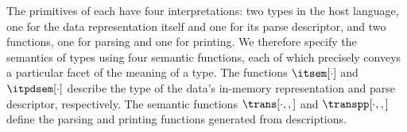 The primitives of \ddc{} each have four interpretations: two
types in the host language, one for the data representation
itself and one for its parse descriptor, and two functions,
one for parsing and one for printing.
We therefore specify the semantics of \ddc{} types using four semantic
functions, each of which precisely conveys a particular facet of the
meaning of a type.  The functions $\itsem[\cdot]$ and $\itpdsem[\cdot]$
describe the type of the data's in-memory representation and 
parse descriptor, respectively. The semantic
functions $\trans[\cdot,,]$ and $\transpp[\cdot,,]$ define
the parsing and printing functions generated from \ddc{} descriptions.


